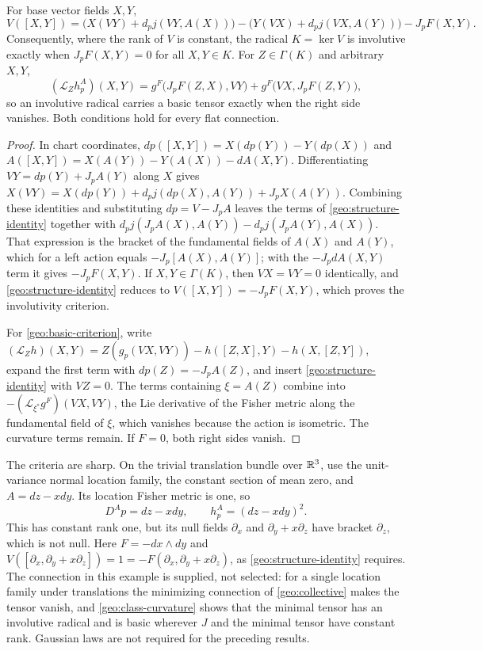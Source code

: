 For base vector fields $X,Y$,
\begin{equation}
V([X,Y])=\bigl(X(VY)+d_pj(VY,A(X))\bigr)-\bigl(Y(VX)+d_pj(VX,A(Y))\bigr)-J_pF(X,Y).
\label{geo:structure-identity}
\end{equation}
Consequently, where the rank of $V$ is constant, the radical $K=\ker V$ is involutive exactly when $J_pF(X,Y)=0$ for all $X,Y\in K$. For $Z\in\Gamma(K)$ and arbitrary $X,Y$,
\begin{equation}
(\mathcal L_Zh^A_p)(X,Y)=g^F\bigl(J_pF(Z,X),VY\bigr)+g^F\bigl(VX,J_pF(Z,Y)\bigr),
\label{geo:basic-criterion}
\end{equation}
so an involutive radical carries a basic tensor exactly when the right side vanishes. Both conditions hold for every flat connection.
\begin{proof}
In chart coordinates, $dp([X,Y])=X(dp(Y))-Y(dp(X))$ and $A([X,Y])=X(A(Y))-Y(A(X))-dA(X,Y)$. Differentiating $VY=dp(Y)+J_pA(Y)$ along $X$ gives $X(VY)=X(dp(Y))+d_pj(dp(X),A(Y))+J_pX(A(Y))$. Combining these identities and substituting $dp=V-J_pA$ leaves the terms of \cref{geo:structure-identity} together with $d_pj(J_pA(X),A(Y))-d_pj(J_pA(Y),A(X))$. That expression is the bracket of the fundamental fields of $A(X)$ and $A(Y)$, which for a left action equals $-J_p[A(X),A(Y)]$; with the $-J_pdA(X,Y)$ term it gives $-J_pF(X,Y)$. If $X,Y\in\Gamma(K)$, then $VX=VY=0$ identically, and \cref{geo:structure-identity} reduces to $V([X,Y])=-J_pF(X,Y)$, which proves the involutivity criterion.

For \cref{geo:basic-criterion}, write $(\mathcal L_Zh)(X,Y)=Z(g_p(VX,VY))-h([Z,X],Y)-h(X,[Z,Y])$, expand the first term with $dp(Z)=-J_pA(Z)$, and insert \cref{geo:structure-identity} with $VZ=0$. The terms containing $\xi=A(Z)$ combine into $-(\mathcal L_{\xi^*}g^F)(VX,VY)$, the Lie derivative of the Fisher metric along the fundamental field of $\xi$, which vanishes because the action is isometric. The curvature terms remain. If $F=0$, both right sides vanish.
\end{proof}

The criteria are sharp. On the trivial translation bundle over $\mathbb R^3$, use the unit-variance normal location family, the constant section of mean zero, and $A=dz-xdy$. Its location Fisher metric is one, so
\begin{equation}
D^A p=dz-xdy,\qquad h^A_p=(dz-xdy)^2.
\end{equation}
This has constant rank one, but its null fields $\partial_x$ and $\partial_y+x\partial_z$ have bracket $\partial_z$, which is not null. Here $F=-dx\wedge dy$ and $V([\partial_x,\partial_y+x\partial_z])=1=-F(\partial_x,\partial_y+x\partial_z)$, as \cref{geo:structure-identity} requires. The connection in this example is supplied, not selected: for a single location family under translations the minimizing connection of \cref{geo:collective} makes the tensor vanish, and \cref{geo:class-curvature} shows that the minimal tensor has an involutive radical and is basic wherever $J$ and the minimal tensor have constant rank. Gaussian laws are not required for the preceding results.

